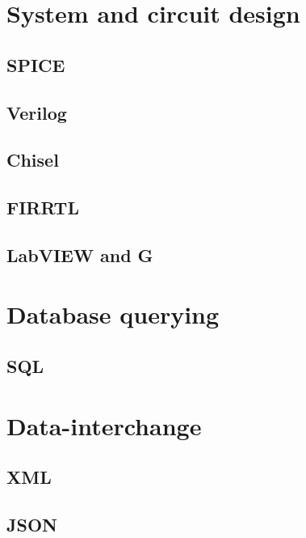 \section{System and circuit design}
\subsection{SPICE}
\subsection{Verilog}
\subsection{Chisel}
\subsection{FIRRTL}
\subsection{LabVIEW and G}

\section{Database querying}
\subsection{SQL}
\section{Data-interchange}
\subsection{XML}
\subsection{JSON}


